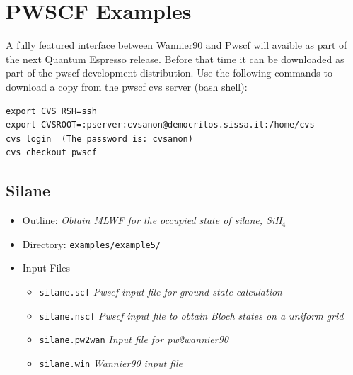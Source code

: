 \documentclass[a4paper,11pt,twoside]{article}
\begin{document}
\cleardoublepage

\section*{PWSCF Examples}

A fully featured interface between Wannier90 and Pwscf will avaible as part of the 
next Quantum Espresso release. Before that time it can be downloaded as part of the
pwscf development distribution. Use the following commands to download a copy from the
pwscf cvs server (bash shell):
\begin{verbatim}
export CVS_RSH=ssh
export CVSROOT=:pserver:cvsanon@democritos.sissa.it:/home/cvs
cvs login  (The password is: cvsanon)
cvs checkout pwscf
\end{verbatim}

\subsection*{Silane}
\begin{itemize}
\item{Outline: \it{Obtain MLWF for the occupied state of silane, SiH$_4$}}
\item{Directory: {\tt examples/example5/}}
\item{Input Files}
\begin{itemize}
\item{ {\tt silane.scf}  {\it Pwscf input file for ground state calculation}}
\item{ {\tt silane.nscf}  {\it Pwscf input file to obtain Bloch states on a uniform grid}}
\item{ {\tt silane.pw2wan}  {\it Input file for pw2wannier90}}
\item{ {\tt silane.win}  {\it Wannier90 input file}}
\end{itemize}

\end{itemize}
\end{document}
